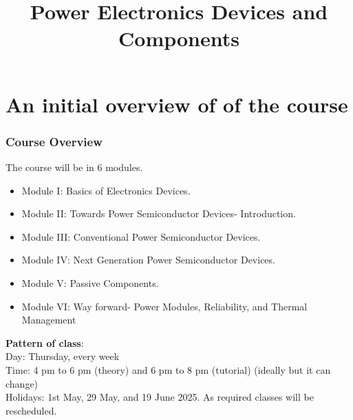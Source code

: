 \section{An initial overview of of the course}
\title[Initial overview]{Power Electronics Devices and Components}
 
\begin{frame}[plain]
    \titlepage
\end{frame}
\begin{frame}
	\frametitle{Course Overview}
The course will be in 6 modules.
		\begin{itemize}
		  \item Module I: Basics of Electronics Devices.
		  \item Module II: Towards Power Semiconductor Devices- Introduction.
		  \item Module III: Conventional Power Semiconductor Devices.
		  \item Module IV: Next Generation Power Semiconductor Devices.
		  \item Module V: Passive Components.
		  \item Module VI: Way forward- Power Modules, Reliability, and Thermal Management
		\end{itemize}
\textbf{Pattern of class}: \\ Day: Thursday, every week \\ 
Time: 4 pm to 6 pm (theory) and 6 pm to 8 pm (tutorial) (ideally but it can change) \\
Holidays: 1st May, 29 May, and 19 June 2025. As required classes will be rescheduled. 
\end{frame}

